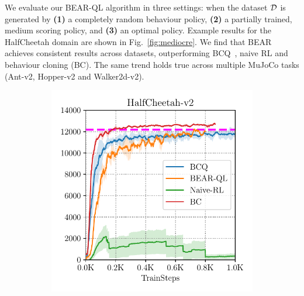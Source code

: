 \documentclass{article}
\begin{document}
We evaluate our BEAR-QL algorithm in three settings: when the dataset $\mathcal{D}$ is generated by \textbf{(1)} a completely random behaviour policy, \textbf{(2)} a partially trained, medium scoring policy, and \textbf{(3)} an optimal policy. 
Example results for the HalfCheetah domain are shown in Fig.~\ref{fig:mediocre}. We find that BEAR achieves consistent results across datasets, outperforming BCQ~\cite{fujimoto2018off}, naive RL and behaviour cloning (BC). The same trend holds true across multiple MuJoCo tasks (Ant-v2, Hopper-v2 and Walker2d-v2).

\begin{figure}
    \centering
    \vspace{-0.05in}
    \begin{subfigure}[t]{0.23\textwidth}
        \centering
        \includegraphics[width=0.99\linewidth]{images/cheetah_optimal_final.pdf}
    \end{subfigure}
    \begin{subfigure}[t]{0.23\textwidth}
        \centering

\end{subfigure}
\end{figure}
\end{document}
